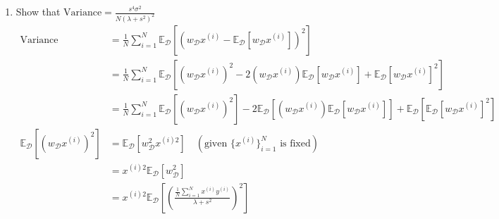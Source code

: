 \documentclass{article}
\theoremstyle{definition}
\theoremstyle{remark}
\begin{document}
\begin{enumerate}[font={\Large\bfseries},left=0pt]
\begin{enumerate}
		\item Show that $\text{Variance} = \frac{s^4 \sigma^2}{N(\lambda + s^2)^2}$
		      \begin{align}
			      \text{Variance}                                                   & = \frac{1}{N} \sum_{i=1}^N \mathbb{E}_{\mathcal{D}} \left[(w_{\mathcal{D}}x^{(i)} - \mathbb{E}_{\mathcal{D}}[w_{\mathcal{D}} x^{(i)}])^2\right]                                                                                                                                                              \\[2pt]
			                                                                        & = \frac{1}{N} \sum_{i=1}^N \mathbb{E}_{\mathcal{D}} \left[(w_{\mathcal{D}}x^{(i)})^2 -2(w_{\mathcal{D}}x^{(i)}) \mathbb{E}_{\mathcal{D}}[w_{\mathcal{D}} x^{(i)}] + \mathbb{E}_{\mathcal{D}}[w_{\mathcal{D}} x^{(i)}]^2\right]                                                                               \\[2pt]
			                                                                        & = \frac{1}{N} \sum_{i=1}^N \mathbb{E}_{\mathcal{D}} \left[(w_{\mathcal{D}}x^{(i)})^2 \right]- 2 \mathbb{E}_{\mathcal{D}} \left[(w_{\mathcal{D}}x^{(i)})\mathbb{E}_{\mathcal{D}}[w_{\mathcal{D}} x^{(i)}] \right] + \mathbb{E}_{\mathcal{D}}\left[ \mathbb{E}_{\mathcal{D}}[w_{\mathcal{D}} x^{(i)}]^2\right] \\[2pt]
			      \mathbb{E}_{\mathcal{D}} \left[(w_{\mathcal{D}}x^{(i)})^2 \right] & = \mathbb{E}_{\mathcal{D}} \left[w_{\mathcal{D}}^2 x^{(i)2}\right] \quad (\text{given } \{x^{(i)}\}^N_{i = 1}\text{ is fixed})                                                                                                                                                                               \\[2pt]
			                                                                        & = x^{(i)2}\mathbb{E}_{\mathcal{D}} \left[w_{\mathcal{D}}^2\right]                                                                                                                                                                                                                                            \\[2pt]
			                                                                        & = x^{(i)2}\mathbb{E}_{\mathcal{D}} \left[\left(\frac{\frac{1}{N}\sum^N_{i = 1} x^{(i)}y^{(i)}}{\lambda + s^2}\right)^2\right]                                                                                                                                                                                \\[2pt]

\end{align}
\end{enumerate}
\end{enumerate}
\end{document}
